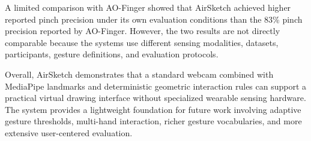 \documentclass[conference]{IEEEtran}
\begin{document}
A limited comparison with AO-Finger showed that AirSketch achieved higher reported pinch precision under its own evaluation conditions than the 83\% pinch precision reported by AO-Finger. However, the two results are not directly comparable because the systems use different sensing modalities, datasets, participants, gesture definitions, and evaluation protocols.

Overall, AirSketch demonstrates that a standard webcam combined with MediaPipe landmarks and deterministic geometric interaction rules can support a practical virtual drawing interface without specialized wearable sensing hardware. The system provides a lightweight foundation for future work involving adaptive gesture thresholds, multi-hand interaction, richer gesture vocabularies, and more extensive user-centered evaluation.
\end{document}
